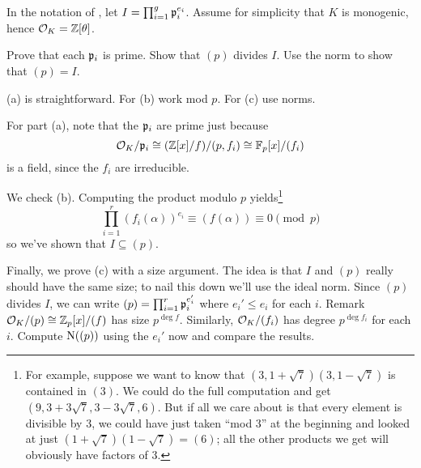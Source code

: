\begin{problem}
	\label{prob:prove_factoring_algorithm}
	In the notation of , let $I = \prod_{i=1}^g \mathfrak p_i^{e_i}$.
	Assume for simplicity that $K$ is monogenic, hence $\mathcal O_K = \mathbb Z[\theta]$.
	\begin{enumerate}[(a)]
		\ii Prove that each $\mathfrak p_i$ is prime.
		\ii Show that $(p)$ divides $I$.
		\ii Use the norm to show that $(p) = I$.
	\end{enumerate}
	\begin{hint}
		(a) is straightforward.
		For (b) work mod $p$.
		For (c) use norms.
	\end{hint}
	\begin{sol}
	For part (a), note that the $\mathfrak p_i$ are prime
	just because 
	\[ \mathcal O_K / \mathfrak p_i
		\cong (\mathbb Z[x] / f) / (p, f_i)
		\cong \mathbb F_p[x] / (f_i) \]
	is a field, since the $f_i$ are irreducible.

	We check (b).
		Computing the product modulo $p$ yields\footnote{%
			For example, suppose we want to know that $(3, 1+\sqrt{7})(3, 1-\sqrt{7})$ is contained in $(3)$.
			We could do the full computation and get $(9, 3+3\sqrt{7}, 3-3\sqrt{7}, 6)$.
			But if all we care about is that every element is divisible by $3$, we could have just taken ``mod $3$''
			at the beginning and looked at just $(1+\sqrt{7})(1-\sqrt{7}) = (6)$;
			all the other products we get will obviously have factors of $3$.
		}
		\[ \prod_{i=1}^{r} (f_i(\alpha))^{e_i}
			\equiv (f(\alpha)) \equiv 0 \pmod p \]
		so we've shown that $I \subseteq (p)$.

	Finally, we prove (c) with a size argument.
		The idea is that $I$ and $(p)$ really should have the same size;
		to nail this down we'll use the ideal norm.
		Since $(p)$ divides $I$, we can write
		$ (p) = \prod_{i=1}^r \mathfrak p_i^{e_i'} $
		where $e_i' \le e_i$ for each $i$.
		Remark $\mathcal O_K / (p) \cong \mathbb Z_{p}[x] / (f)$ has size $p^{\deg f}$.
		Similarly, $\mathcal O_K / (f_i)$ has degree $p^{\deg f_i}$ for each $i$.
		Compute $\operatorname{N}( (p) )$ using the $e_i'$ now and compare the results.
	\end{sol}
\end{problem}
